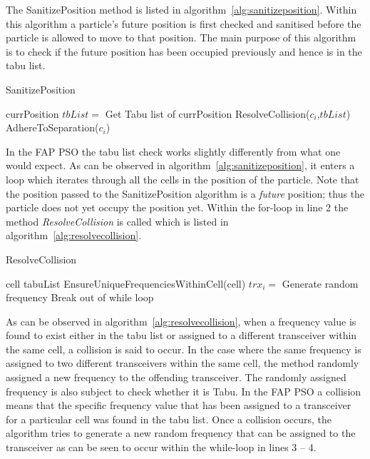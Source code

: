The SanitizePosition method is listed in algorithm~\ref{alg:sanitizeposition}. Within this algorithm a particle's future position is first checked and sanitised before the particle is allowed to move to that position. The main purpose of this algorithm is to check if the future position has been occupied previously and hence is in the tabu list. 
\begin{algorithm}[H]
\caption{SanitizePosition}
\label{alg:sanitizeposition}
\begin{algorithmic}[1]
	\Require currPosition
		\State $tbList = $ Get Tabu list of currPosition
		\State ResolveCollision($c_i$,$tbList$)
		\State AdhereToSeparation($c_i$)
	\EndFor
\end{algorithmic}
\end{algorithm}


In the \gls{FAP} \gls{PSO} the tabu list check works slightly differently from what one would expect. As can be observed in algorithm~\ref{alg:sanitizeposition}, it enters a loop which iterates through all the cells in the position of the particle. Note that the position passed to the SanitizePosition algorithm is a \emph{future} position; thus the particle does not yet occupy the position yet. Within the for-loop in line 2 the method \emph{ResolveCollision} is called which is listed in algorithm~\ref{alg:resolvecollision}.

\begin{algorithm}[H]
\caption{ResolveCollision}
\label{alg:resolvecollision}
\begin{algorithmic}[1]
	\Require cell
	\Require tabuList
    \State EnsureUniqueFrequenciesWithinCell(cell)
				\State $trx_i = $ Generate random frequency
					\State Break out of while loop
				\EndIf
			\EndWhile
	\EndFor
\end{algorithmic}
\end{algorithm}

As can be observed in algorithm~\ref{alg:resolvecollision}, when a frequency value is found to exist either in the tabu list or assigned to a different transceiver within the same cell,  a collision is said to occur. In the case where the same frequency is assigned to two different transceivers within the same cell, the method randomly assigned a new frequency to the offending transceiver. The randomly assigned frequency is also subject to check whether it is Tabu.  In the \gls{FAP} \gls{PSO} a collision means that the specific frequency value that has been assigned to a transceiver for a particular cell was found in the tabu list. Once a collision occurs, the algorithm tries to generate a new random frequency that can be assigned to the transceiver as can be seen to occur within the while-loop in lines 3 -- 4.

